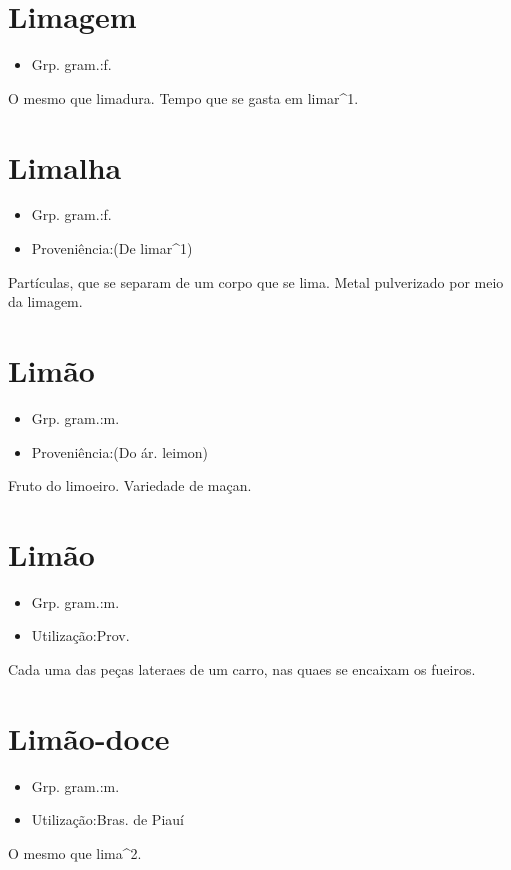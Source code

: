 \section{Limagem}
\begin{itemize}
\item {Grp. gram.:f.}
\end{itemize}
O mesmo que \textunderscore limadura\textunderscore .
Tempo que se gasta em limar^1.
\section{Limalha}
\begin{itemize}
\item {Grp. gram.:f.}
\end{itemize}
\begin{itemize}
\item {Proveniência:(De \textunderscore limar\textunderscore ^1)}
\end{itemize}
Partículas, que se separam de um corpo que se lima.
Metal pulverizado por meio da limagem.
\section{Limão}
\begin{itemize}
\item {Grp. gram.:m.}
\end{itemize}
\begin{itemize}
\item {Proveniência:(Do ár. \textunderscore leimon\textunderscore )}
\end{itemize}
Fruto do limoeiro.
Variedade de maçan.
\section{Limão}
\begin{itemize}
\item {Grp. gram.:m.}
\end{itemize}
\begin{itemize}
\item {Utilização:Prov.}
\end{itemize}
Cada uma das peças lateraes de um carro, nas quaes se encaixam os fueiros.
\section{Limão-doce}
\begin{itemize}
\item {Grp. gram.:m.}
\end{itemize}
\begin{itemize}
\item {Utilização:Bras. de Piauí}
\end{itemize}
O mesmo que \textunderscore lima\textunderscore ^2.
